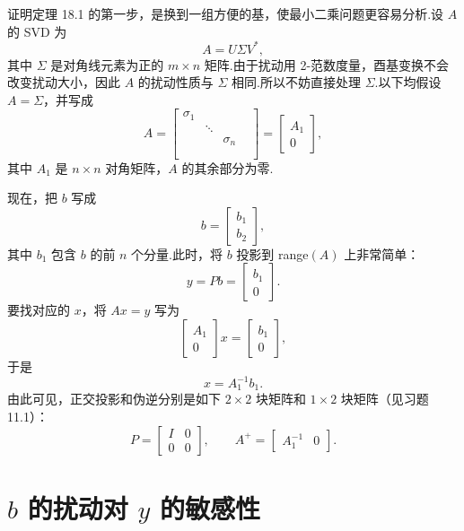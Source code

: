 \documentclass[UTF8,fontset=none,12pt]{ctexart}
\theoremstyle{definition}
\begin{document}
证明定理 18.1 的第一步，是换到一组方便的基，使最小二乘问题更容易分析.设 $A$ 的 SVD 为
\[
A=U\Sigma V^*,
\]
其中 $\Sigma$ 是对角线元素为正的 $m\times n$ 矩阵.由于扰动用 2-范数度量，酉基变换不会改变扰动大小，因此 $A$ 的扰动性质与 $\Sigma$ 相同.所以不妨直接处理 $\Sigma$.以下均假设 $A=\Sigma$，并写成
\begin{equation}
    A=\begin{bmatrix}
    \sigma_1&&\\
    &\ddots&\\
    &&\sigma_n\\
    &&&\\[-6pt]
    &&&
    \end{bmatrix}
    =\begin{bmatrix}A_1\\0\end{bmatrix},
    \tag{18.7}
\end{equation}
其中 $A_1$ 是 $n\times n$ 对角矩阵，$A$ 的其余部分为零.

现在，把 $b$ 写成
\[
b=\begin{bmatrix}b_1\\b_2\end{bmatrix},
\]
其中 $b_1$ 包含 $b$ 的前 $n$ 个分量.此时，将 $b$ 投影到 range$(A)$ 上非常简单：
\[
y=Pb=\begin{bmatrix}b_1\\0\end{bmatrix}.
\]
要找对应的 $x$，将 $Ax=y$ 写为
\[
\begin{bmatrix}A_1\\0\end{bmatrix}x
=\begin{bmatrix}b_1\\0\end{bmatrix},
\]
于是
\begin{equation}
    x=A_1^{-1}b_1.
    \tag{18.8}
\end{equation}
由此可见，正交投影和伪逆分别是如下 $2\times2$ 块矩阵和 $1\times2$ 块矩阵（见习题 11.1）：
\begin{equation}
    P=\begin{bmatrix}I&0\\0&0\end{bmatrix},
    \qquad
    A^+=\begin{bmatrix}A_1^{-1}&0\end{bmatrix}.
    \tag{18.9}
\end{equation}

\section*{$b$ 的扰动对 $y$ 的敏感性}
\end{document}
